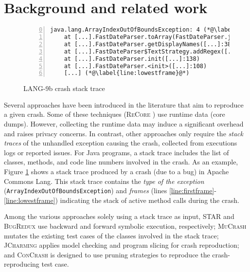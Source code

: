 \section{Background and related work}

\begin{figure}[t]
  \begin{lstlisting}[numbers=left,
      firstnumber=0]
  java.lang.ArrayIndexOutOfBoundsException: 4 (*@\label{line:exception}@*)
    at [...].FastDateParser.toArray(FastDateParser.java:413) (*@\label{line:firstframe}@*)
    at [...].FastDateParser.getDisplayNames([...]:381)
    at [...].FastDateParser$TextStrategy.addRegex([...]:664) (*@\label{line:thirdframe}@*)
    at [...].FastDateParser.init([...]:138)
    at [...].FastDateParser.<init>([...]:108)
    [...] (*@\label{line:lowestframe}@*)
  \end{lstlisting}
  \caption{LANG-9b crash stack trace \cite{just2014defects4j}}
  \label{lst:moho:stacktrace}
\end{figure}

Several approaches have been introduced in the literature that aim to reproduce a given crash. Some of these techniques (\eg \textsc{ReCore} \cite{Rossler2013}) use runtime data (\ie core dumps). However, collecting the runtime data may induce a significant overhead and raises privacy concerns. In contrast, other approaches \cite{BPT17concrash, Chen2015, Nayrolles2017, Xuan2015} only require the \textit{stack traces} of the unhandled exception causing the crash, collected from executions logs or reported issues.
For Java programs, a stack trace includes the list of classes, methods, and code line numbers involved in the crash. As an example, Figure \ref{lst:moho:stacktrace} shows a stack trace produced by a crash (due to a bug) in \textrm{Apache Commons Lang}. This stack trace contains the \textit{type of the exception} (\texttt{Ar\-ray\-In\-dex\-Out\-Of\-Bounds\-Ex\-cep\-tion}) and \textit{frames} (lines \ref{line:firstframe}-\ref{line:lowestframe}) indicating the stack of active method calls during the crash. 

Among the various approaches solely using a stack trace as input, \textsc{STAR} \cite{Chen2015} and \textsc{BugRedux} \cite{jin2012bugredux} use backward and forward symbolic execution, respectively; \textsc{MuCrash} \cite{Xuan2015} mutates the existing test cases of the classes involved in the stack trace; \textsc{JCharming} \cite{Nayrolles2017, nayrolles2015jcharming} applies model checking and program slicing for crash reproduction; and \textsc{ConCrash} \cite{BPT17concrash} is designed to use pruning strategies to reproduce the crash-reproducing test case. 

